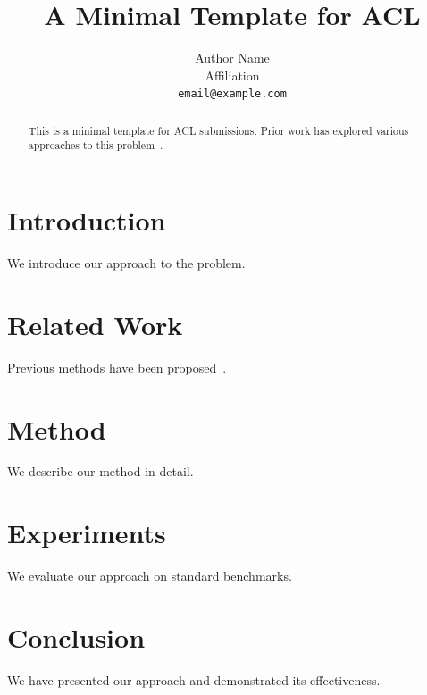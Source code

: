 \documentclass[11pt]{article}
\title{A Minimal Template for ACL}
\author{
  Author Name \\
  Affiliation \\
  \texttt{email@example.com}
}
\begin{document}
\maketitle

\begin{abstract}
This is a minimal template for ACL submissions.
Prior work has explored various approaches to this problem~\citep{example2024}.
\end{abstract}

\section{Introduction}
We introduce our approach to the problem.

\section{Related Work}
Previous methods have been proposed~\citep{example2024}.

\section{Method}
We describe our method in detail.

\section{Experiments}
We evaluate our approach on standard benchmarks.

\section{Conclusion}
We have presented our approach and demonstrated its effectiveness.


\end{document}
